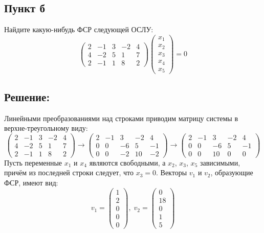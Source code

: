 \documentclass[12pt]{article}
\begin{document}
    \subsection*{Пункт б}
    Найдите какую-нибудь ФСР следующей ОСЛУ:
    \[
        \begin{pmatrix}
            2 & -1 & 3 & -2 & 4 \\
            4 & -2 & 5 & 1  & 7 \\
            2 & -1 & 1 & 8  & 2
        \end{pmatrix}
        \begin{pmatrix}
            x_1 \\
            x_2 \\
            x_3 \\
            x_4 \\
            x_5
        \end{pmatrix}
        = 0
    \]

    \subsection*{Решение:}
    Линейными преобразованиями над строками приводим матрицу системы в верхне-треугольному виду:
    \[
        \begin{pmatrix}
            2 & -1 & 3 & -2 & 4 \\
            4 & -2 & 5 & 1  & 7 \\
            2 & -1 & 1 & 8  & 2
        \end{pmatrix}
        \rightarrow
        \begin{pmatrix}
            2 & -1 & 3  & -2 & 4  \\
            0 & 0  & -6 & 5  & -1 \\
            0 & 0  & -2 & 10 & -2
        \end{pmatrix}
        \rightarrow
        \begin{pmatrix}
            2 & -1 & 3  & -2 & 4  \\
            0 & 0  & -6 & 5  & -1 \\
            0 & 0  & 10 & 0  & 0
        \end{pmatrix}
    \]
    Пусть переменные $x_1$ и $x_4$ являются свободными, а $x_2$, $x_3$, $x_5$ зависимыми, причём из последней строки следует, что $x_3 = 0$. Векторы $v_1$ и $v_2$, образующие ФСР, имеют
    вид:
    \[
        v_1 =
        \begin{pmatrix}
            1 \\
            2 \\
            0 \\
            0 \\
            0
        \end{pmatrix}
        , \;
        v_2 =
        \begin{pmatrix}
            0  \\
            18 \\
            0  \\
            1  \\
            5
        \end{pmatrix}
    \]
\end{document}
